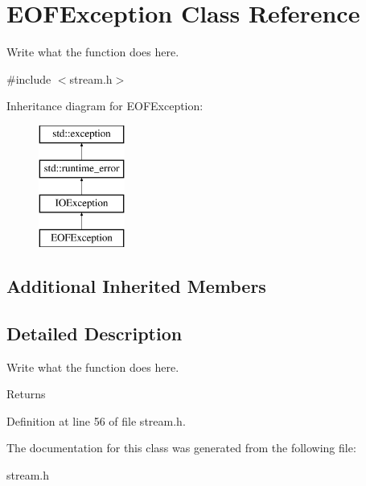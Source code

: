 \hypertarget{classEOFException}{\section{E\+O\+F\+Exception Class Reference}
\label{classEOFException}
}


Write what the function does here.  




{\ttfamily \#include $<$stream.\+h$>$}

Inheritance diagram for E\+O\+F\+Exception\+:\begin{figure}[H]
\begin{center}
\leavevmode
\includegraphics[height=4.000000cm]{classEOFException}
\end{center}
\end{figure}
\subsection*{Additional Inherited Members}


\subsection{Detailed Description}
Write what the function does here. 

\begin{DoxyReturn}{Returns}

\end{DoxyReturn}


Definition at line 56 of file stream.\+h.



The documentation for this class was generated from the following file\+:\begin{DoxyCompactItemize}
\item 
stream.\+h\end{DoxyCompactItemize}
